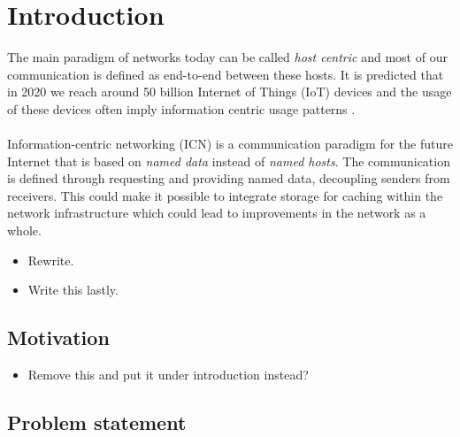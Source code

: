 \section{Introduction}
The main paradigm of networks today can be called  \textit{host centric} and most of our communication is defined as end-to-end between these hosts. It is predicted that in 2020 we reach around 50 billion Internet of Things (IoT) devices \cite{alanCarlton} and the usage of these devices often imply information centric usage patterns \cite{Ahlgren2012}. 
\\\\
Information-centric networking (ICN) is a communication paradigm for the future Internet that is based on \textit{named data} instead of \textit{named hosts}. The communication is defined through requesting and providing named data, decoupling senders from receivers. This could make it possible to integrate storage for caching within the network infrastructure \cite{Ahlgren2012} which could lead to improvements in the network as a whole.

\begin{itemize}
	\item Rewrite.
	\item Write this lastly.
\end{itemize}



\subsection{Motivation}
\begin{itemize}
	\item Remove this and put it under introduction instead?
\end{itemize}

\subsection{Problem statement}

